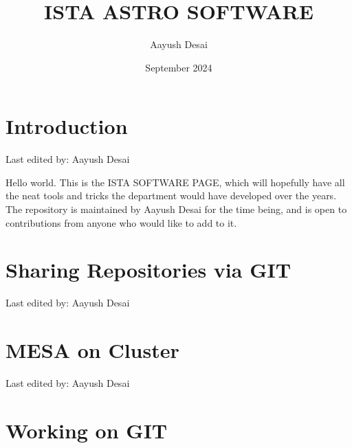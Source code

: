 \documentclass{article}
\title{ISTA ASTRO SOFTWARE}
\author{Aayush Desai}
\date{September 2024}
\newcommand{\setlasteditor}[1]{\gdef\lasteditor{#1}}
\newcommand{\lastedited}{%
    \vspace{1mm}\small{Last edited by: \lasteditor }\vspace{3mm}
}
\begin{document}
\maketitle


\tableofcontents
\newpage
\section*{Introduction}
\setlasteditor{Aayush Desai}
\lastedited

Hello world. This is the ISTA SOFTWARE PAGE, which will hopefully have all the neat tools and tricks the department would have developed over the years. The repository is maintained by Aayush Desai for the time being, and is open to contributions from anyone who would like to add to it.

\section{Sharing Repositories via GIT}
\setlasteditor{Aayush Desai}
\lastedited

\section{MESA on Cluster}
\setlasteditor{Aayush Desai}
\lastedited

\section{Working on GIT}
\end{document}
